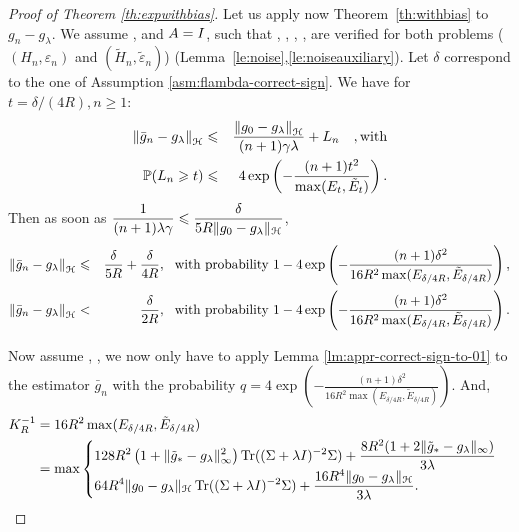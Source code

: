 \begin{proof}[Proof of Theorem \ref{th:expwithbias}]
Let us apply now Theorem~\ref{th:withbias} to $g_n - g_\lambda$. We assume ,  and $A = I$, such that , , , ,  are verified for both problems ($(H_n,\varepsilon_n)$ and $(\tilde{H}_n,\tilde{\varepsilon}_n)$) (Lemma~\ref{le:noise},\ref{le:noiseauxiliary}). Let $\delta$ correspond to the one of Assumption \ref{asm:flambda-correct-sign}.
 We have for $t = \delta/(4R), n \geqslant 1$:   
\begin{eqnarray*}
\left\|\bar{g}_n - g_\lambda \right\|_{\mathcal H} &\leqslant& \frac{ \left\| g_0 - g_\lambda\right\|_{\mathcal H}}{(n+1)\gamma\lambda} + L_n \quad,\text{with} \\
 {\mathbb P}(L_n \geqslant t ) &\leqslant&  4\exp\left(-\frac{(n+1) t^2}{\max(E_t,\tilde{E}_t)} \right).
\end{eqnarray*}
Then as soon as $\displaystyle\frac{1}{(n+1)\lambda\gamma} \leqslant  \frac{\delta} {5R\|g_0- g_\lambda\|_{\mathcal H}}$, 
\begin{eqnarray*}
\left\|\bar{g}_n - g_\lambda \right\|_{\mathcal H} &\leqslant& \frac{\delta}{5R} + \frac{\delta}{4R},\ \text{ with probability } 1-4\exp\left(-\frac{(n+1) \delta^2}{16 R^2\max(E_{\delta/4R},\tilde{E}_{\delta/4R})} \right), \\
\left\|\bar{g}_n - g_\lambda \right\|_{\mathcal H} &<& \frac{\delta}{2R},\ \text{ with probability } 1-4\exp\left(-\frac{(n+1) \delta^2}{16 R^2\max(E_{\delta/4R},\tilde{E}_{\delta/4R})} \right).
\end{eqnarray*}

Now assume , , we now only have to apply Lemma \ref{lm:appr-correct-sign-to-01} to the estimator $\bar{g}_n$ with the probability $\displaystyle q = 4\exp\left(-\frac{(n+1) \delta^2}{16 R^2\max(E_{\delta/4R},\tilde{E}_{\delta/4R})} \right)$. And,
\begin{align*}
K_R^{-1} &= 16 R^2\max(E_{\delta/4R},\tilde{E}_{\delta/4R}) \\
 &= \max
  \begin{cases}
    \displaystyle 128 R^2 \left(1+\|\tilde{g}_*- g_\lambda\|^2_\infty\right)\operatorname{Tr}((\Sigma + \lambda I)^{-2}\Sigma)+\frac{8 R^2 ( 1 + 2 \| \tilde{g}_* - g_\lambda\|_\infty )}{3\lambda}\\
    \displaystyle 64 R^4 \|g_0- g_\lambda\|_{\mathcal H} \operatorname{Tr}((\Sigma + \lambda I)^{-2}\Sigma)+\frac{16 R^4  \| g_0 - g_\lambda\|_{\mathcal H}}{3\lambda}.
  \end{cases}
\end{align*}


\end{proof}

